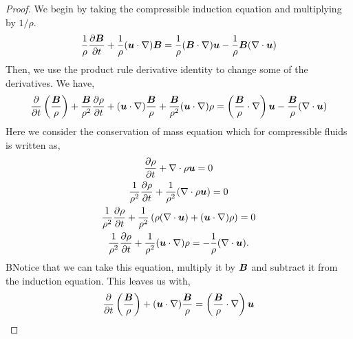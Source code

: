 \documentclass{article}
\begin{document}
\begin{proof}
    We begin by taking the compressible induction equation and multiplying by
    $1/\rho$. 
    \begin{gather*}
        \frac{1}{\rho}\frac{\partial \boldsymbol{B}}{\partial t} + \frac{1}{\rho}(\boldsymbol{u}\cdot\nabla)\boldsymbol{B} =
        \frac{1}{\rho}(\boldsymbol{B}\cdot\nabla)\boldsymbol{u} - \frac{1}{\rho}\boldsymbol{B}(\nabla \cdot{\boldsymbol{u}})
    \end{gather*}
    Then, we use the product rule derivative identity to change some of the
    derivatives. We have,
    \begin{gather*}
        \frac{\partial }{\partial t}\left(\frac{\boldsymbol{B}}{\rho}\right) + \frac{\boldsymbol{B}}{\rho^2}\frac{\partial \rho}{\partial t} + 
        (\boldsymbol{u}\cdot\nabla)\frac{\boldsymbol{B}}{\rho} + 
        \frac{\boldsymbol{B}}{\rho^2}(\boldsymbol{u}\cdot\nabla)\rho =
        \left(\frac{\boldsymbol{B}}{\rho}\cdot\nabla\right)\boldsymbol{u} -
        \frac{\boldsymbol{B}}{\rho}(\nabla \cdot{\boldsymbol{u}})
    \end{gather*}
    Here we consider the conservation of mass equation which for compressible
    fluids is written as,
    \begin{gather*}
        \frac{\partial \rho}{\partial t} + \nabla \cdot{\rho\boldsymbol{u}} = 0\\
        \frac{1}{\rho^2}\frac{\partial \rho}{\partial t} + \frac{1}{\rho^2}(\nabla \cdot{\rho\boldsymbol{u}}) = 0\\
        \frac{1}{\rho^2}\frac{\partial \rho}{\partial t} + \frac{1}{\rho^2}\left(\rho(\nabla \cdot{\boldsymbol{u}}) +
        (\boldsymbol{u}\cdot\nabla)\rho\right) = 0\\
        \frac{1}{\rho^2}\frac{\partial \rho}{\partial t} + \frac{1}{\rho^2}
        (\boldsymbol{u}\cdot\nabla)\rho = -\frac{1}{\rho}(\nabla \cdot{\boldsymbol{u}}).
    \end{gather*}
    BNotice that we can take this equation, multiply it by $\boldsymbol{B}$ and subtract it
    from the induction equation. This leaves us with, 
    \begin{gather*}
        \frac{\partial }{\partial t}\left(\frac{\boldsymbol{B}}{\rho}\right) + 
        (\boldsymbol{u}\cdot\nabla)\frac{\boldsymbol{B}}{\rho} =
        \left(\frac{\boldsymbol{B}}{\rho}\cdot\nabla\right)\boldsymbol{u}
    \end{gather*}

\end{proof}
\end{document}
